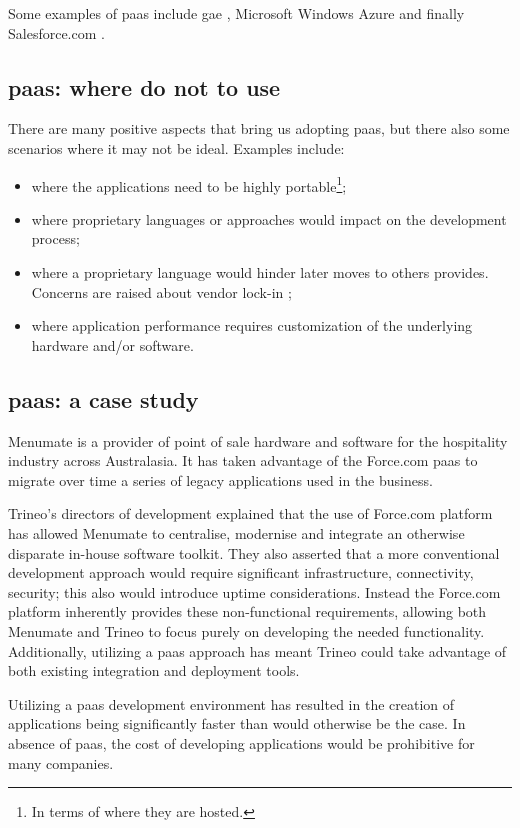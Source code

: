 Some examples of \ac{paas} include \ac{gae} \cite{googleAppEngine}, Microsoft Windows Azure
\cite{windowsAzure} and finally Salesforce.com \cite{salesforcePlatform}.

\subsection{\acs{paas}: where do not to use}
\label{sec:problemSpace-paas-whereNotToUse}
There are many positive aspects that bring us adopting \ac{paas}, but there also some scenarios where it
may not be ideal. Examples include:

\begin{itemize}
	\item{where the applications need to be highly portable\footnote{In terms of where they are hosted.};}
	\item{where proprietary languages or approaches would impact on the development process;}
	\item{where a proprietary language would hinder later moves to others provides. Concerns are raised
		about vendor lock-in \cite{vendorLockin};}
	\item{where application performance requires customization of the underlying hardware and/or software.}
\end{itemize}

\subsection{\acs{paas}: a case study}
\label{sec:problemSpace-paas-caseStudy}
Menumate \cite{menumateCaseStudy} is a provider of point of sale hardware and software for the hospitality
industry across Australasia. It has taken advantage of the Force.com \ac{paas} to migrate over time a
series of legacy applications used in the business.

Trineo's \cite{trineoCaseStudy} directors of development explained that the use of Force.com platform has
allowed Menumate to centralise, modernise and integrate an otherwise disparate in-house software toolkit. 
They also asserted that a more conventional development approach would require significant infrastructure,
connectivity, security; this also would introduce uptime considerations. Instead the Force.com
platform inherently provides these non-functional requirements, allowing both Menumate and Trineo to
focus purely on developing the needed functionality. Additionally, utilizing a \ac{paas} approach
has meant Trineo could take advantage of both existing integration and deployment tools.

Utilizing a \ac{paas} development environment has resulted in the creation of applications being
significantly faster than would otherwise be the case. In absence of \ac{paas}, the cost of developing
applications would be prohibitive for many companies.